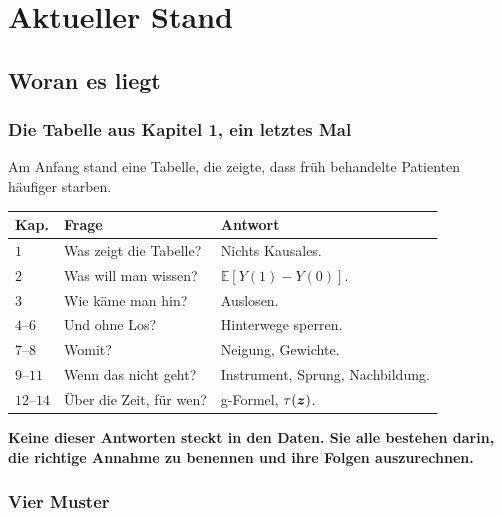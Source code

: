 \part{Aktueller Stand}

\chapter{Woran es liegt}

\section{Die Tabelle aus Kapitel 1, ein letztes Mal}

\begin{merksatz}
Am Anfang stand eine Tabelle, die zeigte, dass früh behandelte Patienten häufiger starben.

\begin{center}
{\small
\renewcommand{\arraystretch}{1.5}
\begin{tabular}{@{}P{1.2cm}P{3.6cm}P{3.6cm}@{}}
\toprule
\textbf{Kap.} & \textbf{Frage} & \textbf{Antwort}\\
\midrule
$1$ & Was zeigt die Tabelle? & Nichts Kausales.\\
$2$ & Was will man wissen? & $\mathbb{E}[Y(1)-Y(0)]$.\\
$3$ & Wie käme man hin? & Auslosen.\\
$4$--$6$ & Und ohne Los? & Hinterwege sperren.\\
$7$--$8$ & Womit? & Neigung, Gewichte.\\
$9$--$11$ & Wenn das nicht geht? & Instrument, Sprung, Nachbildung.\\
$12$--$14$ & Über die Zeit, für wen? & g-Formel, $\tau(\boldsymbol{z})$.\\
\bottomrule
\end{tabular}}
\end{center}

\begin{center}
\begin{minipage}{0.9\textwidth}
\textbf{Keine dieser Antworten steckt in den Daten. Sie alle bestehen darin, die richtige Annahme zu benennen und ihre Folgen auszurechnen.}
\end{minipage}
\end{center}
\end{merksatz}

\section{Vier Muster}


